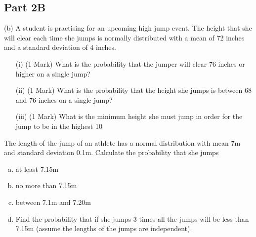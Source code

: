 


\subsection*{Part 2B}
(b)	A student is practising for an upcoming high jump event.  The height that she will clear each time she jumps is normally distributed with a 
mean of 72 inches and a standard deviation of 4 inches.  
\begin{itemize}
\item[(i)] (1 Mark) 	What is the probability that the jumper will clear 76 inches or higher on a single jump?
\item[(ii)] (1 Mark) 	What is the probability that the height she jumps is between 68 and 76 inches on a single jump?
\item[(iii)] (1 Mark) 	What is the minimum height she must jump in order for the jump to be in the highest 10%
\end{itemize}
    
    \newpage
\item The length of the jump of an athlete has a normal distribution with mean 7m and standard deviation 0.1m. Calculate the probability that she jumps
\begin{enumerate}[(a)]
\item at least 7.15m
\item no more than 7.15m
\item between 7.1m and 7.20m 
\item Find the probability that if she jumps 3 times all the jumps will be less than 7.15m (assume the lengths of the jumps are independent). 
\end{enumerate}



